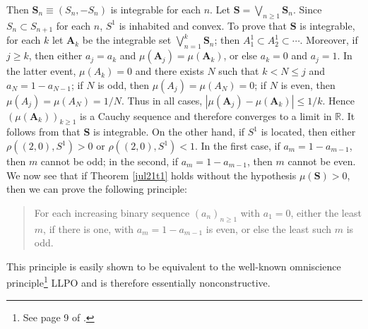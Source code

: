 \documentclass[11pt]{article}%
\begin{document}
\noindent
Then $\mathbf{S}_{n}\equiv\left(  S_{n},-S_{n}\right)  $ is integrable for
each $n$. Let $\mathbf{S}=%
{\textstyle\bigvee_{n\geqslant1}}
\mathbf{S}_{n}$. Since $S_{n}\subset S_{n+1}$ for each $n$, $S^{1}$ is
inhabited and convex. To prove that $\mathbf{S}$ is integrable, for each $k$
let $\mathbf{A}_{k}$ be the integrable set $%
{\textstyle\bigvee_{n=1}^{k}}
\mathbf{S}_{n}$; then $A_{1}^{1}\subset A_{2}^{1}\subset\cdots$. Moreover, if
$j\geqslant k$, then either $a_{j}=a_{k}$ and $\mu(\mathbf{A}_{j}%
)=\mu(\mathbf{A}_{k})$, or else $a_{k}=0$ and $a_{j}=1$. In the latter event,
$\mu(A_{k})=0$ and there exists $N$ such that $k<N\leqslant j$ and
$a_{N}=1-a_{N-1}$; if $N$ is odd, then $\mu(A_{j})=\mu(A_{N})=0$; if $N$ is
even, then $\mu(A_{j})=\mu(A_{N})=1/N$. Thus in all cases, $\left\vert
\mu(\mathbf{A}_{j})-\mu(\mathbf{A}_{k})\right\vert \leqslant1/k$. Hence
$\left(  \mu(\mathbf{A}_{k})\right)  _{k\geqslant1}$ is a Cauchy sequence and
therefore converges to a limit in $\mathbb{R}$. It follows from \cite[Ch. 6,
(3.8)]{BB} that $\mathbf{S}$ is integrable. On the other hand, if $S^{1}$ is
located, then either $\rho\left(  \left(  2,0\right)  ,S^{1}\right)  >0$ or
$\rho\left(  \left(  2,0\right)  ,S^{1}\right)  <1$. In the first case, if
$a_{m}=1-a_{m-1}$, then $m$ cannot be odd; in the second, if $a_{m}=1-a_{m-1}%
$, then $m$ cannot be even. We now see that if Theorem \ref{jul21t1} holds
without the hypothesis $\mu(\mathbf{S})>0$, then we can prove the following principle:

\begin{quote}
For each increasing binary sequence $\left(  a_{n}\right)  _{n\geqslant1}$
with $a_{1}=0$, either the least $m$, if there is one, with $a_{m}=1-a_{m-1}$
is even, or else the least such $m$ is odd.
\end{quote}

%

\noindent
This principle is easily shown to be equivalent to the well-known omniscience
principle\footnote{%
\normalfont\sf
See page 9 of \cite{BVtech}.} \textsf{LLPO} and is therefore essentially nonconstructive.%

\medskip
\end{document}
